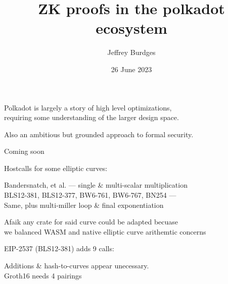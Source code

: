 \documentclass{beamer}
\title{ZK proofs in the polkadot ecosystem} %
\author{Jeffrey Burdges} %
\date{26 June 2023}
\begin{document}
\maketitle


\begin{frame}

Polkadot is largely a story of high level optimizations, \\

\hspace{5pt} requiring some understanding of the larger design space. \\ \bigskip


Also an ambitious but grounded approach to formal security.


\end{frame}


\begin{frame}{Coming soon}

Hostcalls for some elliptic curves: \\ \smallskip

\hspace{5pt} Bandersnatch, et al. --- single \& multi-scalar multiplication \\

\hspace{5pt} BLS12-381, BLS12-377, BW6-761, BW6-767, BN254 --- \\
\hspace{10pt}  Same, plus multi-miller loop \& final exponentiation \\ 

\bigskip %

Afaik any crate for said curve could be adapted becuase \\
we balanced WASM and native elliptic curve arithemtic concerns

\bigskip\bigskip

EIP-2537 (BLS12-381) adds 9 calls:  \\ \smallskip

\hspace{5pt} Additions \& hash-to-curves appear unecessary. \\

\hspace{5pt} Groth16 needs 4 pairings \\

\end{frame}
\end{document}
